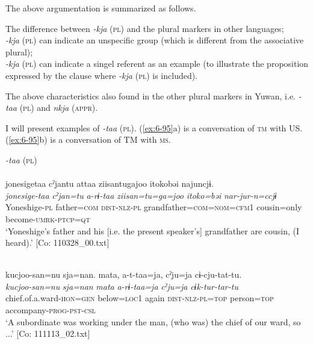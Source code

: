 The above argumentation is summarized as follows.

\ea\label{ex:6-94}
  The difference between \textit{-kja} (\textsc{pl}) and the plural markers in other languages;\\

 \ea \textit{-kja} (\textsc{pl}) can indicate an unspecific group (which is different from the associative plural);\\
\ex \textit{-kja} (\textsc{pl}) can indicate a singel referent as an example (to illustrate the proposition expressed by the clause where \textit{-kja} (\textsc{pl}) is included).\\

\z
\z

The above characteristics also found in the other plural markers in Yuwan, i.e. \textit{-taa} (\textsc{pl}) and \textit{nkja} (\textsc{appr}).

I will present examples of \textit{-taa} (\textsc{pl}). (\ref{ex:6-95}a) is a conversation of \textsc{tm} with US. (\ref{ex:6-95}b) is a conversation of TM with \textsc{ms}.

\ea\label{ex:6-95}
  \textit{-taa} (\textsc{pl})\\
 \ea{}\\
{\TM}
\glll  jonesigetaa  cˀjantu  attaa  ziisantugajoo    {\textbar}itoko{\textbar}bəi  najuncjɨ.\\
\textit{jonesige-taa}  \textit{cˀjan=tu}  \textit{a-rɨ-taa}  \textit{ziisan=tu=ga=joo}   \textit{itoko=bəi}  \textit{nar-jur-n=ccjɨ}\\
Yoneshige-\textsc{pl}  father=\textsc{com}  \textsc{dist}-\textsc{nlz}-\textsc{pl}  grandfather=\textsc{com}=\textsc{nom}=\textsc{cfm}1      cousin=only  become-\textsc{umrk}-\textsc{ptcp}=\textsc{qt}\\
\glt ‘Yoneshige’s father and his [i.e. the present speaker’s] grandfather are cousin, (I heard).’ [Co: 110328\_00.txt]
\z

\ex{}\\
{\TM}
\glll  kucjoo-san=nu  sja=nan.  mata,  a-t-taa=ja,     cˀju=ja  cɨ-cju-tat-tu.\\
\textit{kucjoo-san=nu}  \textit{sja=nan}  \textit{mata}  \textit{a-rɨ-taa=ja}     \textit{cˀju=ja}  \textit{cɨk-tur-tar-tu}\\
chief.of.a.ward-\textsc{hon}=\textsc{gen}  below=\textsc{loc1}  again  \textsc{dist}-\textsc{nlz}-\textsc{pl}=\textsc{top} person=\textsc{top}  accompany-\textsc{prog}-\textsc{pst}-\textsc{csl}\\
\glt ‘A subordinate was working under the man, (who was) the chief of our ward, so ...’ [Co: 111113\_02.txt]
\z

